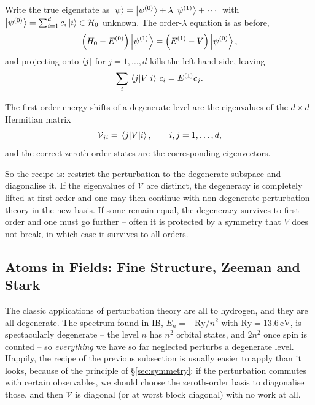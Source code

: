 \documentclass[a4paper]{scrartcl}
\newcommand{\Ry}{\mathrm{Ry}}
\begin{document}
Write the true eigenstate as $\ket\psi = \ket{\psi^{(0)}} + \lambda\ket{\psi^{(1)}}+\cdots$ with $\ket{\psi^{(0)}} = \sum_{i=1}^d c_i \ket{i} \in \mathcal{H}_0$ unknown. The order-$\lambda$ equation is as before,
$$
\left( H_0 - E^{(0)} \right)\ket{\psi^{(1)}} = \left( E^{(1)} - V \right)\ket{\psi^{(0)}},
$$
and projecting onto $\bra{j}$ for $j = 1,\dots,d$ kills the left-hand side, leaving
$$
\sum_{i}\mel{j}{V}{i}\, c_i = E^{(1)} c_j.
$$

\begin{theorem}
    The first-order energy shifts of a degenerate level are the eigenvalues of the $d\times d$ Hermitian matrix
    $$
    \mathcal{V}_{ji} = \mel{j}{V}{i}, \qquad i,j = 1,\dots,d,
    $$
    and the correct zeroth-order states are the corresponding eigenvectors.
\end{theorem}

So the recipe is: restrict the perturbation to the degenerate subspace and diagonalise it. If the eigenvalues of $\mathcal{V}$ are distinct, the degeneracy is completely lifted at first order and one may then continue with non-degenerate perturbation theory in the new basis. If some remain equal, the degeneracy survives to first order and one must go further -- often it is protected by a symmetry that $V$ does not break, in which case it survives to all orders.

\begin{center}
\end{center}

\subsection{Atoms in Fields: Fine Structure, Zeeman and Stark}

The classic applications of perturbation theory are all to hydrogen, and they are all degenerate. The spectrum found in IB, $E_n = -\Ry/n^2$ with $\Ry = 13.6\,\mathrm{eV}$, is spectacularly degenerate -- the level $n$ has $n^2$ orbital states, and $2n^2$ once spin is counted -- so \emph{everything} we have so far neglected perturbs a degenerate level. Happily, the recipe of the previous subsection is usually easier to apply than it looks, because of the principle of \S\ref{sec:symmetry}: if the perturbation commutes with certain observables, we should choose the zeroth-order basis to diagonalise those, and then $\mathcal{V}$ is diagonal (or at worst block diagonal) with no work at all.
\end{document}
